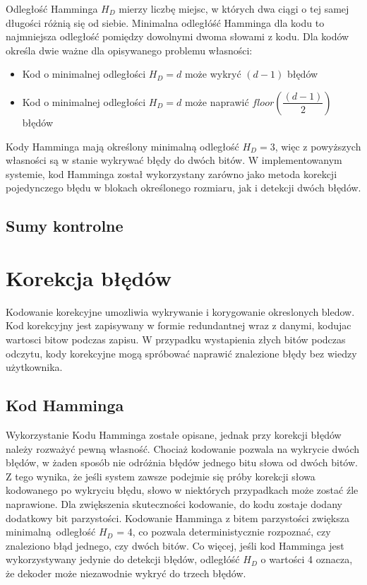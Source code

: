 Odległość Hamminga $H_D$ mierzy liczbę miejsc, w których dwa ciągi o tej samej długości różnią się od siebie. Minimalna odległóść Hamminga dla kodu to najmniejsza odległość pomiędzy dowolnymi dwoma słowami z kodu. Dla kodów określa dwie ważne dla opisywanego problemu własności:
\begin{itemize}
        \item Kod  o minimalnej odległości $H_D = d$ może wykryć $(d-1)$ błędów
        \item Kod o minimalnej odległości $H_D = d$ może naprawić $floor\left(\dfrac{(d-1)}{2}\right)$ błędów
\end{itemize}
Kody Hamminga mają określony minimalną odległość $H_D = 3$, więc z powyższych własności są w stanie wykrywać błędy do dwóch bitów.  W implementowanym systemie, kod Hamminga został wykorzystany zarówno jako metoda korekcji pojedynczego błędu w blokach określonego rozmiaru, jak i detekcji dwóch błędów.


\subsection{Sumy kontrolne}
    
\section {Korekcja błędów}
Kodowanie korekcyjne umozliwia wykrywanie i korygowanie okreslonych bledow. Kod korekcyjny jest zapisywany w formie redundantnej wraz z danymi, kodujac wartosci bitow podczas zapisu. W przypadku wystapienia złych bitów podczas odczytu, kody korekcyjne mogą spróbować naprawić znalezione błędy bez wiedzy użytkownika.
\subsection{Kod Hamminga}
Wykorzystanie Kodu Hamminga zostałe opisane, jednak przy korekcji błędów należy rozważyć pewną własność. Chociaż kodowanie pozwala na wykrycie dwóch błędów, w żaden sposób nie odróżnia błędów jednego bitu słowa od dwóch bitów. Z tego wynika, że jeśli system zawsze podejmie się próby korekcji słowa kodowanego po wykryciu błędu, słowo w niektórych przypadkach może zostać źle naprawione.
Dla zwiększenia skuteczności kodowanie, do kodu zostaje dodany dodatkowy bit parzystości. Kodowanie Hamminga z bitem parzystości zwiększa minimalną odległość $H_D$ = 4, co pozwala deterministycznie rozpoznać, czy znaleziono błąd jednego, czy dwóch bitów. Co więcej, jeśli kod Hamminga jest wykorzystywany jedynie do detekcji błędów, odległóść $H_D$ o wartości 4 oznacza, że dekoder może niezawodnie wykryć do trzech błędów.  
